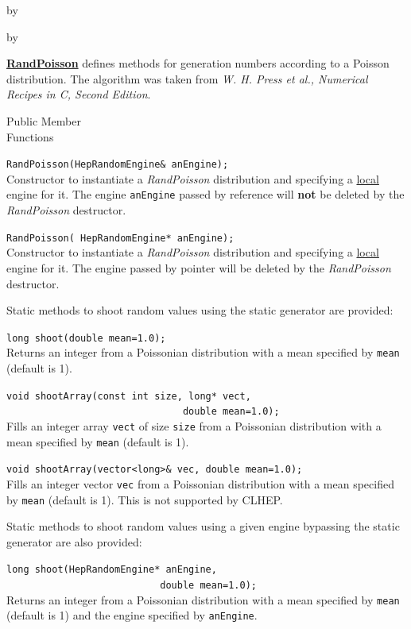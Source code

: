 \documentclass[twoside]{article}
\newcommand{\comp}[1]{\texttt{#1}}%
\newcommand{\entrylabel}[1]{\mbox{\textbf{{#1}}}\hfil}%
\newenvironment{entry}
{\begin{list}{}%
    {\renewcommand{\makelabel}{\entrylabel}%
     \setlength{\labelwidth}{90pt}%
     \setlength{\leftmargin}{\labelwidth}
     \advance\leftmargin by \labelsep%
      }%
    }%
  {\end{list}}
\newcommand{\Entrylabel}[1]%
{\raisebox{0pt}[1ex][0pt]{\makebox[\labelwidth][l]%
    {\parbox[t]{\labelwidth}{\hspace{0pt}\textbf{{#1}}}}}}
\newenvironment{Entry}%
{\renewcommand{\entrylabel}{\Entrylabel}\begin{entry}}%
  {\end{entry}}
\begin{document}
\begin{description}
\begin{Entry}
\begin{Entry}
   \begin{description}
     \item \underline{\bf RandPoisson}  defines methods for generation numbers
       according to a Poisson distribution.  The algorithm was taken
       from {\em W. H. Press et al., Numerical Recipes in C, Second Edition}.
   \end{description}
   
\item[Public Member\\ Functions]

    \verb+RandPoisson(HepRandomEngine& anEngine);+\\
    Constructor to instantiate a {\em RandPoisson}
    distribution and specifying a \underline{local} engine for it.
    The engine \comp{anEngine} passed by reference will {\bf not}
    be deleted by the {\em RandPoisson} destructor.
  
    \verb+RandPoisson( HepRandomEngine* anEngine);+\\
    Constructor to instantiate a {\em RandPoisson}
    distribution and specifying a \underline{local} engine for it.
    The engine passed by pointer will be deleted by the {\em RandPoisson}
    destructor.

    Static methods to shoot random values using the static generator
    are provided:

    \verb+long shoot(double mean=1.0);+\\
    Returns an integer from a Poissonian distribution with a mean
    specified by \comp{mean} (default is 1).

    \verb+void shootArray(const int size, long* vect,+\\
    \verb+                               double mean=1.0);+\\
    Fills an integer array \comp{vect} of size \comp{size} from a
    Poissonian distribution with a mean specified by \comp{mean}
    (default is 1).

    \verb+void shootArray(vector<long>& vec, double mean=1.0);+\\
    Fills an integer vector \comp{vec} from a
    Poissonian distribution with a mean specified by \comp{mean}
    (default is 1).  This is not supported by CLHEP.

    Static methods to shoot random values using a given engine
    bypassing the static generator are also provided:

    \verb+long shoot(HepRandomEngine* anEngine,+\\
    \verb+                           double mean=1.0);+\\
    Returns an integer from a Poissonian distribution with a mean
    specified by \comp{mean} (default is 1) and the engine specified
    by \comp{anEngine}.
  

\end{Entry}
\end{Entry}
\end{description}
\end{document}
